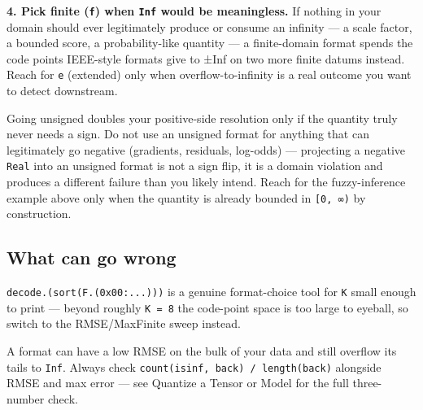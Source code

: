 \textbf{4. Pick finite (\texttt{f}) when \texttt{Inf} would be meaningless.} If nothing in your domain should ever legitimately produce or consume an infinity — a scale factor, a bounded score, a probability-like quantity — a finite-domain format spends the code points IEEE-style formats give to ±Inf on two more finite datums instead. Reach for \texttt{e} (extended) only when overflow-to-infinity is a real outcome you want to detect downstream.



\begin{tcolorbox}[toptitle=-1mm,bottomtitle=1mm,colback=admonition-warning!50!white,colframe=admonition-warning,title=\textbf{An unsigned format is not free precision}]
Going unsigned doubles your positive-side resolution only if the quantity truly never needs a sign. Do not use an unsigned format for anything that can legitimately go negative (gradients, residuals, log-odds) — projecting a negative \texttt{Real} into an unsigned format is not a sign flip, it is a domain violation and produces a different failure than you likely intend. Reach for the fuzzy-inference example above only when the quantity is already bounded in \texttt{[0, ∞)} by construction.

\end{tcolorbox}


\subsection{What can go wrong}



\label{7385351218440078181}{}


\begin{tcolorbox}[toptitle=-1mm,bottomtitle=1mm,colback=admonition-warning!50!white,colframe=admonition-warning,title=\textbf{Enumeration intuition does not scale past small K}]
\texttt{decode.(\allowbreak{}sort(\allowbreak{}F.(\allowbreak{}0x00:...)))} is a genuine format-choice tool for \texttt{K} small enough to print — beyond roughly \texttt{K = 8} the code-point space is too large to eyeball, so switch to the RMSE/MaxFinite sweep instead.

\end{tcolorbox}


\begin{tcolorbox}[toptitle=-1mm,bottomtitle=1mm,colback=admonition-note!50!white,colframe=admonition-note,title=\textbf{RMSE alone hides overflow}]
A format can have a low RMSE on the bulk of your data and still overflow its tails to \texttt{Inf}. Always check \texttt{count(\allowbreak{}isinf, back) /\allowbreak{} length(\allowbreak{}back)} alongside RMSE and max error — see Quantize a Tensor or Model for the full three-number check.

\end{tcolorbox}


